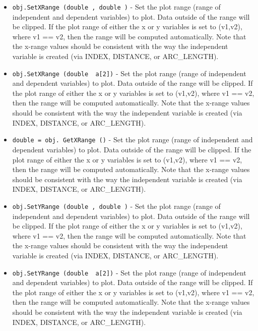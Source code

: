 \begin{itemize}
\item  \verb|obj.SetXRange (double , double )| -  Set the plot range (range of independent and dependent variables)
 to plot. Data outside of the range will be clipped. If the plot
 range of either the x or y variables is set to (v1,v2), where
 v1 == v2, then the range will be computed automatically. Note that
 the x-range values should be consistent with the way the independent
 variable is created (via INDEX, DISTANCE, or ARC\_LENGTH).

\item  \verb|obj.SetXRange (double  a[2])| -  Set the plot range (range of independent and dependent variables)
 to plot. Data outside of the range will be clipped. If the plot
 range of either the x or y variables is set to (v1,v2), where
 v1 == v2, then the range will be computed automatically. Note that
 the x-range values should be consistent with the way the independent
 variable is created (via INDEX, DISTANCE, or ARC\_LENGTH).

\item  \verb|double = obj. GetXRange ()| -  Set the plot range (range of independent and dependent variables)
 to plot. Data outside of the range will be clipped. If the plot
 range of either the x or y variables is set to (v1,v2), where
 v1 == v2, then the range will be computed automatically. Note that
 the x-range values should be consistent with the way the independent
 variable is created (via INDEX, DISTANCE, or ARC\_LENGTH).

\item  \verb|obj.SetYRange (double , double )| -  Set the plot range (range of independent and dependent variables)
 to plot. Data outside of the range will be clipped. If the plot
 range of either the x or y variables is set to (v1,v2), where
 v1 == v2, then the range will be computed automatically. Note that
 the x-range values should be consistent with the way the independent
 variable is created (via INDEX, DISTANCE, or ARC\_LENGTH).

\item  \verb|obj.SetYRange (double  a[2])| -  Set the plot range (range of independent and dependent variables)
 to plot. Data outside of the range will be clipped. If the plot
 range of either the x or y variables is set to (v1,v2), where
 v1 == v2, then the range will be computed automatically. Note that
 the x-range values should be consistent with the way the independent
 variable is created (via INDEX, DISTANCE, or ARC\_LENGTH).


\end{itemize}
